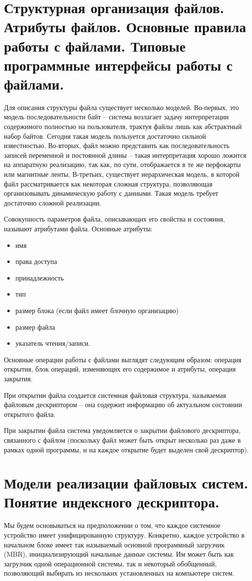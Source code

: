 \documentclass[a4paper,12pt,titlepage,finall]{article}
\begin{document}
\section{Структурная организация файлов. Атрибуты файлов. Основные правила работы
с файлами. Типовые программные интерфейсы работы с файлами.}
Для описания структуры файла существует несколько моделей. Во-первых, это модель последовательности байт -- система возлагает задачу интерпретации содержимого полностью на пользователя, трактуя файлы лишь как абстрактный набор байтов. Сегодня такая модель пользуется достаточно сильной известностью. Во-вторых, файл можно представить как последовательность записей переменной и постоянной длины -- такая интерпретация хорошо ложится на аппаратную реализацию, так как, по сути, отображается в те же перфокарты или магнитные ленты. В-третьих, существует иерархическая модель, в которой файл рассматривается как некоторая сложная структура, позволяющая организовывать динамическую работу с данными. Такая модель требует достаточно сложной реализации.

Совокупность параметров файла, описывающих его свойства и состояния, называют атрибутами файла. Основные атрибуты:
\begin{itemize}
    \item имя
    \item права доступа
    \item принадлежность
    \item тип
    \item размер блока (если файл имеет блочную организацию)
    \item размер файла
    \item указатель чтения/записи.
\end{itemize}

Основные операции работы с файлами выглядят следующим образом: операция открытия, блок операций, изменяющих его содержимое и атрибуты, операция закрытия.

При открытии файла создается системная файловая структура, называемая файловым дескриптором -- она содержит информацию об актуальном состоянии открытого файла.

При закрытии файла система уведомляется о закрытии файлового дескриптора, связанного с файлом (поскольку файл может быть открыт несколько раз даже в рамках одной программы, и на каждое открытие будет выделен свой дескриптор).

\section{Модели реализации файловых систем. Понятие индексного дескриптора.}
Мы будем основываться на предположении о том, что каждое системное устройство имеет унифицированную структуру. Конкретно, каждое устройство в начальном блоке имеет так называемый основной программный загрузчик (MBR), инициализирующий начальные данные системы. Им может быть как загрузчик одной операционной системы, так и некоторый обобщенный, позволяющий выбирать из нескольких установленных на компьютере систем.
\end{document}
